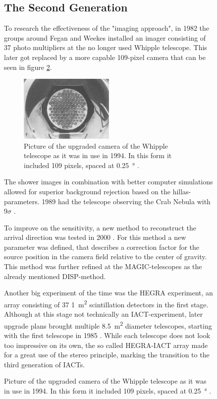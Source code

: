 \begin{figure}
\subsection{The Second Generation}
To research the effectiveness of the "imaging approach", in 1982 the groups around Fegan and Weekes
installed an imager consisting of 37 photo multipliers at the no longer used Whipple telescope.
This later got replaced by a more capable 109-pixel camera that can be seen in figure \ref{fig:whipple_cam}.

\begin{figure}
	\centering
	\captionsetup{width=0.9\linewidth}
    \includegraphics[width=0.5\textwidth]{images/whipple_cam.png}
    \caption{
		Picture of the upgraded camera of the Whipple telescope as it was in use in 1994.
		In this form it included 109 pixels, spaced at \SI{0.25}{\degree} \cite{Cawley1995}.}  %
    \label{fig:whipple_cam}
\end{figure}

The shower images in combination with better computer simulations allowed for 
superior background rejection based on the  hillas-parameters.
1989 had the telescope observing the Crab Nebula with 9$\sigma$ 
\cite{1989ApJ...342..379W}.

To improve on the sensitivity, a new method to reconstruct 
the arrival direction was tested in 2000 \cite{Lessard:2000yf}.
For this method a new parameter was defined, that describes a correction factor 
for the source position in the camera field relative to the center of gravity.
This method was further refined at the MAGIC-telescopes as the already mentioned DISP-method.

Another big experiment of the time was the HEGRA experiment, an array consisting 
of 37 \SI{1}{\meter^2} scintillation detectors \cite{ALLKOFER1990345} in the first stage.
Although at this stage not technically an IACT-experiment, later upgrade plans
brought multiple \SI{8.5}{\meter^2} diameter telescopes, starting with the first 
telescope in 1985 \cite{DAUM19971}.
While each telescope does not look too impressive on its own,
the so called HEGRA-IACT array made for a great use of the stereo principle,
marking the transition to the third generation of IACTs.



\end{figure}
